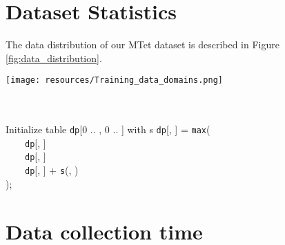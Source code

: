 \documentclass[11pt]{article}
\begin{document}
\appendix

\section{Dataset Statistics}

The data distribution of our MTet dataset is described in Figure 
\ref{fig:data_distribution}.


\begin{figure*}[ht!]
    \centering
    \texttt{[image: resources/Training\_data\_domains.png]}

    \caption{Training data distribution across multiple domains}
    \label{fig:data_distribution}
\end{figure*}

\begin{algorithm}[tb!]
\small
\caption{Alignment algorithm for weakly-aligned pairs of documents. The algorithm strips away a portion of sentences in each document and matches the remaining sentences into pairs, aiming to maximize the total BLEU score with respect to a given translation model.}\label{alg:three}
\label{alg:dp}
\hrulefill\\
\hrulefill \\
 Initialize table \texttt{dp}[0 .. , 0 .. ] with s\;
 \For {} {
    \For {} {
    \texttt{dp}[, ] = \texttt{max}(  \\
    \ \ \ \ \texttt{dp}[, ]  \\
    \ \ \ \ \texttt{dp}[, ] \\
    \ \ \ \ \texttt{dp}[, ] + \texttt{s}(, ) \\ );
}}
 \;
 \;
 \;
 \While{} {
 }
 \;
 \hrulefill
\end{algorithm}

\section{Data collection time}
\end{document}
